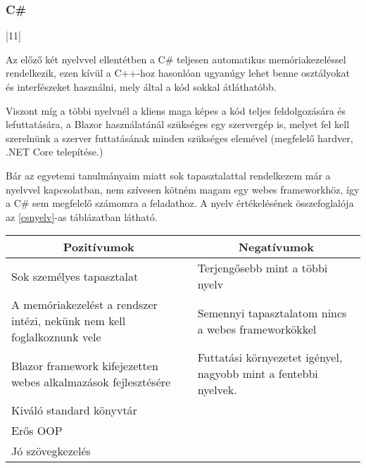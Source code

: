 \subsubsection{C\#}

[11] 

Az előző két nyelvvel ellentétben a C\# teljesen automatikus memóriakezeléssel rendelkezik, ezen kívül a C++-hoz hasonlóan ugyanúgy lehet benne osztályokat és interfészeket használni, mely által a kód sokkal átláthatóbb.

Viszont míg a többi nyelvnél a kliens maga képes a kód teljes feldolgozására és lefuttatására, a Blazor használatánál szükséges egy szervergép is, melyet fel kell szerelnünk a szerver futtatásának minden szükséges elemével (megfelelő hardver, .NET Core telepítése.)

Bár az egyetemi tanulmányaim miatt sok tapasztalattal rendelkezem már a nyelvvel kapcsolatban, nem szívesen kötném magam egy webes frameworkhöz, így a C\# sem megfelelő számomra a feladathoz. A nyelv értékelésének összefoglalója az \ref{csnyelv}-as táblázatban látható.

\begin{center}
  \begin{tabularx}{\textwidth}{X X}
    \hline
    \multicolumn{1}{c}{\bfseries{Pozitívumok}}                              & \multicolumn{1}{c}{\bfseries{Negatívumok}}                      \\
    \hline
    Sok személyes tapasztalat                                               & Terjengősebb mint a többi nyelv                                 \\
    A memóriakezelést a rendszer intézi, nekünk nem kell foglalkoznunk vele & Semennyi tapasztalatom nincs a webes frameworkökkel             \\
    Blazor framework kifejezetten webes alkalmazások fejlesztésére          & Futtatási környezetet igényel, nagyobb mint a fentebbi nyelvek. \\
    Kiváló standard könyvtár                                                                                                                  \\
    Erős OOP                                                                                                                                  \\
    Jó szövegkezelés                                                                                                                          \\
    \hline
  \end{tabularx}
\end{center}

